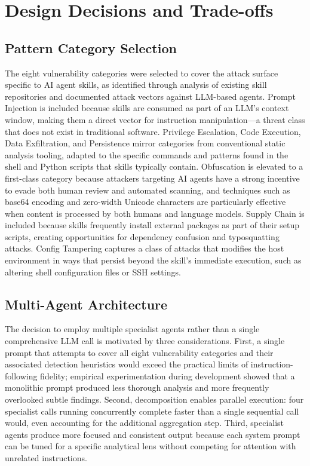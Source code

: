 \section{Design Decisions and Trade-offs}
\label{sec:tradeoffs}

\subsection{Pattern Category Selection}

The eight vulnerability categories were selected to cover the attack surface specific to AI agent skills, as identified through analysis of existing skill repositories and documented attack vectors against LLM-based agents. Prompt Injection is included because skills are consumed as part of an LLM's context window, making them a direct vector for instruction manipulation---a threat class that does not exist in traditional software. Privilege Escalation, Code Execution, Data Exfiltration, and Persistence mirror categories from conventional static analysis tooling, adapted to the specific commands and patterns found in the shell and Python scripts that skills typically contain. Obfuscation is elevated to a first-class category because attackers targeting AI agents have a strong incentive to evade both human review and automated scanning, and techniques such as base64 encoding and zero-width Unicode characters are particularly effective when content is processed by both humans and language models. Supply Chain is included because skills frequently install external packages as part of their setup scripts, creating opportunities for dependency confusion and typosquatting attacks. Config Tampering captures a class of attacks that modifies the host environment in ways that persist beyond the skill's immediate execution, such as altering shell configuration files or SSH settings.

\subsection{Multi-Agent Architecture}

The decision to employ multiple specialist agents rather than a single comprehensive LLM call is motivated by three considerations. First, a single prompt that attempts to cover all eight vulnerability categories and their associated detection heuristics would exceed the practical limits of instruction-following fidelity; empirical experimentation during development showed that a monolithic prompt produced less thorough analysis and more frequently overlooked subtle findings. Second, decomposition enables parallel execution: four specialist calls running concurrently complete faster than a single sequential call would, even accounting for the additional aggregation step. Third, specialist agents produce more focused and consistent output because each system prompt can be tuned for a specific analytical lens without competing for attention with unrelated instructions.

